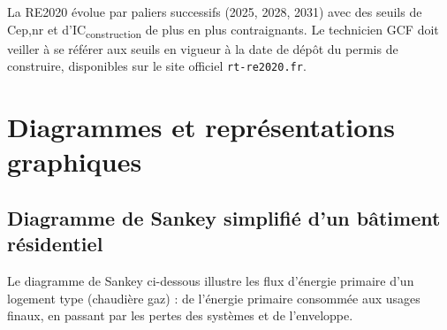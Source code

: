 \begin{attention}
La RE2020 évolue par paliers successifs (2025, 2028, 2031) avec des seuils de Cep,nr et d'IC\textsubscript{construction} de plus en plus contraignants. Le technicien GCF doit veiller à se référer aux seuils en vigueur à la date de dépôt du permis de construire, disponibles sur le site officiel \texttt{rt-re2020.fr}.
\end{attention}

\section{Diagrammes et représentations graphiques}

\subsection{Diagramme de Sankey simplifié d'un bâtiment résidentiel}

Le diagramme de Sankey ci-dessous illustre les flux d'énergie primaire d'un logement type (chaudière gaz) : de l'énergie primaire consommée aux usages finaux, en passant par les pertes des systèmes et de l'enveloppe.


